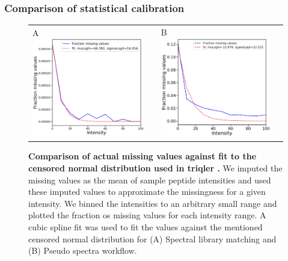 \documentclass[11pt]{article}
\begin{document}
\subsubsection*{Comparison of statistical calibration}
\begin{figure}[hbt]
    \centering
    \centering
    \begin{tabular}{lclc} 
        A \includegraphics[width=0.5\linewidth]{../../result/report_plots/osw_fraction_missing_values.png} & &%
        B \includegraphics[width=0.5\linewidth]{../../result/report_plots/diann_fraction_missing_values.png} & \\%
    \end{tabular}
  \caption{{\bf Comparison of actual missing values against fit to the censored normal distribution used in triqler \cite{kall2020integrating}.} We imputed the missing values as the mean of sample peptide intensities and used these imputed values to approximate the missingness for a given intensity. We binned the intensities to an arbitrary small range and plotted the fraction os missing values for each intensity range. A cubic spline fit was used to fit the values against the mentioned censored normal distribution for (A) Spectral library matching  and (B) Pseudo spectra workflow. \label{fig:fraction_missing_values}}
\end{figure}
\end{document}
